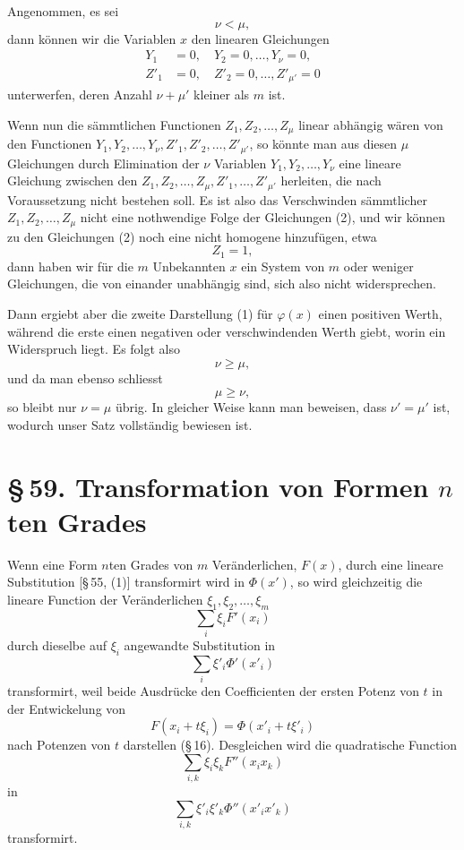 \documentclass[11pt]{article}
\providecommand{\sect}[2]{\section*{\S\,#1. #2}}
\begin{document}
Angenommen, es sei
\[
 \nu<\mu,
\]
dann können wir die Variablen $x$ den linearen Gleichungen
\begin{equation}
\begin{aligned}
 Y_1&=0,\quad Y_2=0,\ldots,Y_\nu=0,\\
 Z'_1&=0,\quad Z'_2=0,\ldots,Z'_{\mu'}=0
\end{aligned}
\tag{2}
\end{equation}
unterwerfen, deren Anzahl $\nu+\mu'$ kleiner als $m$ ist.

Wenn nun die sämmtlichen Functionen $Z_1,Z_2,\ldots,Z_\mu$ linear abhängig wären von den Functionen $Y_1,Y_2,\ldots,Y_\nu,Z'_1,Z'_2,\ldots,Z'_{\mu'}$, so könnte man aus diesen $\mu$ Gleichungen durch Elimination der $\nu$ Variablen $Y_1,Y_2,\ldots,Y_\nu$ eine lineare Gleichung zwischen den $Z_1,Z_2,\ldots,Z_\mu,Z'_1,\ldots,Z'_{\mu'}$ herleiten, die nach Voraussetzung nicht bestehen soll. Es ist also das Verschwinden sämmtlicher $Z_1,Z_2,\ldots,Z_\mu$ nicht eine nothwendige Folge der Gleichungen (2), und wir können zu den Gleichungen (2) noch eine nicht homogene hinzufügen, etwa
\[
 Z_1=1,
\]
dann haben wir für die $m$ Unbekannten $x$ ein System von $m$ oder weniger Gleichungen, die von einander unabhängig sind, sich also nicht widersprechen.

Dann ergiebt aber die zweite Darstellung (1) für $\varphi(x)$ einen positiven Werth, während die erste einen negativen oder verschwindenden Werth giebt, worin ein Widerspruch liegt. Es folgt also
\[
 \nu\geq \mu,
\]
und da man ebenso schliesst
\[
 \mu\geq \nu,
\]
so bleibt nur $\nu=\mu$ übrig. In gleicher Weise kann man beweisen, dass $\nu'=\mu'$ ist, wodurch unser Satz vollständig bewiesen ist.

\sect{59}{Transformation von Formen $n$ten Grades}

Wenn eine Form $n$ten Grades von $m$ Veränderlichen, $F(x)$, durch eine lineare Substitution [\S\,55, (1)] transformirt wird in $\Phi(x')$, so wird gleichzeitig die lineare Function der Veränderlichen $\xi_1,\xi_2,\ldots,\xi_m$
\begin{equation}
 \sum_i \xi_i F'(x_i)
\tag{1}
\end{equation}
durch dieselbe auf $\xi_i$ angewandte Substitution in
\begin{equation}
 \sum_i \xi'_i\Phi'(x'_i)
\tag{2}
\end{equation}
transformirt, weil beide Ausdrücke den Coefficienten der ersten Potenz von $t$ in der Entwickelung von
\[
 F(x_i+t\xi_i)=\Phi(x'_i+t\xi'_i)
\]
nach Potenzen von $t$ darstellen (\S\,16). Desgleichen wird die quadratische Function
\begin{equation}
 \sum_{i,k}\xi_i\xi_k F''(x_i x_k)
\tag{3}
\end{equation}
in
\begin{equation}
 \sum_{i,k}\xi'_i\xi'_k\Phi''(x'_i x'_k)
\tag{4}
\end{equation}
transformirt.
\end{document}
